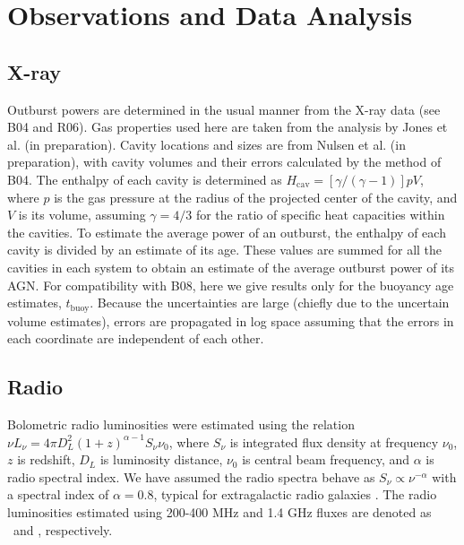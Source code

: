 \documentclass{emulateapj}
\begin{document}
\section{Observations and Data Analysis}
\label{sec:data}

\subsection{X-ray}
\label{sec:xray}

Outburst powers are determined in the usual manner from the X-ray data
(see B04 and R06). Gas properties used here are taken from the
analysis by Jones et al. (in preparation). Cavity locations and sizes
are from Nulsen et al. (in preparation), with cavity volumes and their
errors calculated by the method of B04.  The enthalpy of each cavity is determined as
$H_{\mathrm{cav}} = [\gamma/(\gamma-1)] p V$, where $p$ is the gas
pressure at the radius of the projected center of the cavity, and $V$
is its volume, assuming $\gamma = 4/3$ for the ratio of specific heat
capacities within the cavities. To estimate the average power of an
outburst, the enthalpy of each cavity is divided by an estimate of its
age. These values are summed for all the cavities in each system to
obtain an estimate of the average outburst power of its AGN.  For
compatibility with B08, here we give results only for the buoyancy age
estimates, $t_{\mathrm{buoy}}$. Because the uncertainties are large
(chiefly due to the uncertain volume estimates), errors are propagated
in log space assuming that the errors in each coordinate are 
independent of each other.

\subsection{Radio}
\label{sec:radio}

Bolometric radio luminosities were estimated using the relation $\nu
L_{\nu} = 4 \pi D_L^2 (1+z)^{\alpha-1} S_{\nu} \nu_0$, where $S_{\nu}$
is integrated flux density at frequency $\nu_0$, $z$ is redshift,
$D_L$ is luminosity distance, $\nu_0$ is central beam frequency, and $\alpha$ is radio spectral index. We have assumed
the radio spectra behave as $S_{\nu} \propto \nu^{-\alpha}$ with a
spectral index of $\alpha = 0.8$, typical for extragalactic radio galaxies
\citep{1992ARA&A..30..575C}. The radio luminosities estimated using
200-400 MHz and 1.4 GHz fluxes are denoted as \plow\ and \phigh,
respectively.
\end{document}
